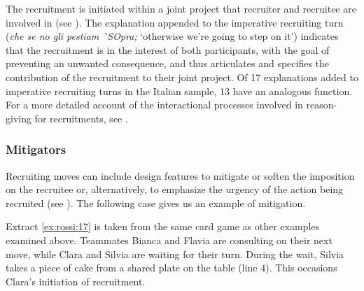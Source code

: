 \documentclass[output=paper,modfonts]{langscibook}
\begin{document}
The recruitment is initiated within a joint project that recruiter and recruitee are involved in (see ). The explanation appended to the imperative recruiting turn (\textit{che se no gli pestiam \`{}SOpra;} ‘otherwise we're going to step on it’) indicates that the recruitment is in the interest of both participants, with the goal of preventing an unwanted consequence, and thus articulates and specifies the contribution of the recruitment to their joint project. Of 17 explanations added to imperative recruiting turns in the Italian sample, 13 have an analogous function. For a more detailed account of the interactional processes involved in reason-giving for recruitments, see \cite{BaranovaDingemanse2016}.

\subsubsection{Mitigators}\label{sec:rossi:3.4.2}
Recruiting moves can include design features to mitigate or soften the imposition on the recruitee or, alternatively, to emphasize the urgency of the action being recruited (see \citealt{BrownLevinson1987,BlumKulkaHouseKasper1989}). The following case gives us an example of mitigation. 

Extract \ref{ex:rossi:17} is taken from the same card game as other examples examined above. Teammates Bianca and Flavia are consulting on their next move, while Clara and Silvia are waiting for their turn. During the wait, Silvia takes a piece of cake from a shared plate on the table (line 4). This occasions Clara's initiation of recruitment.
\end{document}
